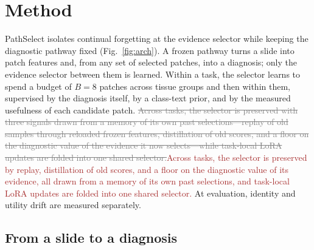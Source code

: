\documentclass{article}
\newif\ifmarkup \markuptrue
\newcommand{\repc}[3]{\ifmarkup\textcolor{gray}{\sout{#2}}\textcolor{#1}{#3}\else#3\fi}
\newcommand{\repB}[2]{\repc{brown}{#1}{#2}}   %
\begin{document}
\section{Method}
\label{sec:method}

PathSelect isolates continual forgetting at the evidence selector while keeping the diagnostic pathway fixed (Fig.~\ref{fig:arch}). A frozen pathway turns a slide into patch features and, from any set of selected patches, into a diagnosis; only the evidence selector between them is learned. Within a task, the selector learns to spend a budget of $B=8$ patches across tissue groups and then within them, supervised by the diagnosis itself, by a class-text prior, and by the measured usefulness of each candidate patch. \repB{Across tasks, the selector is preserved with three signals drawn from a memory of its own past selections---replay of old samples through reloaded frozen features, distillation of old scores, and a floor on the diagnostic value of the evidence it now selects---while task-local LoRA updates are folded into one shared selector.}{Across tasks, the selector is preserved by replay, distillation of old scores, and a floor on the diagnostic value of its evidence, all drawn from a memory of its own past selections, and task-local LoRA updates are folded into one shared selector.} At evaluation, identity and utility drift are measured separately.

\subsection{From a slide to a diagnosis}
\label{ssec:setup}
\end{document}
